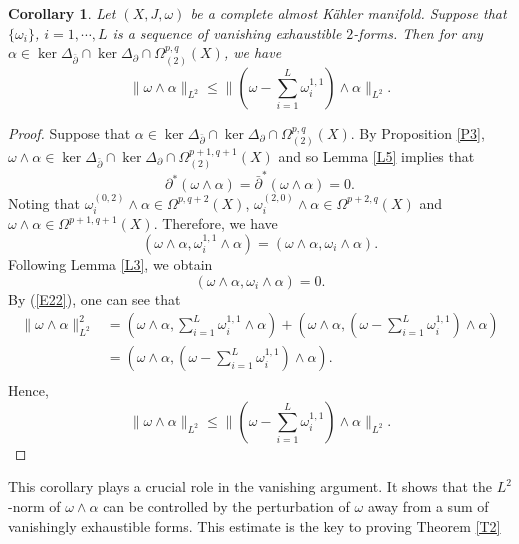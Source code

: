 \documentclass[12pt, twoside]{article}
\newtheorem{corollary}[theorem]{Corollary}
\theoremstyle{definition}
\numberwithin{equation}{section}
\def \a {\alpha }
\def \De {\Delta}
\def\w {\omega}
\def\Om{\Omega}
\def\pa{\partial}
\begin{document}
	\begin{corollary}\label{C1}
		Let  $(X,J,\w)$ be a complete almost K\"{a}hler manifold. Suppose that $\{\w_{i}\}$, $i=1,\cdots,L$ is a sequence of vanishing exhaustible $2$-forms. Then for any $\a\in\ker{\De_{\bar{\pa}}}\cap\ker{\De_{\pa}}\cap\Om^{p,q}_{(2)}(X)$,  we have
		\begin{equation*}
		\|\w\wedge\a\|_{L^2}\leq \|(\w-\sum_{i=1}^{L}\w^{1,1}_{i})\wedge \a\|_{L^2}.
		\end{equation*}
	\end{corollary}
	
	\begin{proof}
		Suppose that $\a\in\ker{\De_{\bar{\pa}}}\cap\ker{\De_{\pa}}\cap\Om^{p,q}_{(2)}(X)$. By Proposition \ref{P3},
		 $\w\wedge\a\in\ker{\De_{\bar{\pa}}}\cap\ker{\De_{\pa}}\cap\Om^{p+1,q+1}_{(2)}(X)$ and so Lemma \ref{L5} implies that $$\pa^{\ast}(\w\wedge\a)=\bar{\pa}^{\ast}(\w\wedge\a)=0.$$ 
		Noting that $\w_{i}^{(0,2)}\wedge\a\in\Om^{p,q+2}(X)$, $\w_{i}^{(2,0)}\wedge\a\in\Om^{p+2,q}(X)$ and $\w\wedge\a\in\Om^{p+1,q+1}(X)$. Therefore, we have
		\begin{equation*}
		(\w\wedge\a,\w_{i}^{1,1}\wedge\a)=(\w\wedge\a,\w_{i}\wedge\a).
		\end{equation*}
		Following Lemma \ref{L3}, we obtain
		\begin{equation}\label{E22}
		(\w\wedge\a,\w_{i}\wedge \a)=0.
		\end{equation}	
		By (\ref{E22}), one can see that
		\begin{equation*}
		\begin{split}
		\|\w\wedge\a\|_{L^2}^{2}&=(\w\wedge\a, \sum_{i=1}^{L}\w^{1,1}_{i}\wedge\a)+(\w\wedge\a,(\w-\sum_{i=1}^{L}\w^{1,1}_{i})\wedge \a)\\
		&=(\w\wedge\a,(\w-\sum_{i=1}^{L}\w^{1,1}_{i})\wedge \a).\\
		\end{split}
		\end{equation*}
		Hence,
		$$\|\w\wedge\a\|_{L^2}\leq \|(\w-\sum_{i=1}^{L}\w^{1,1}_{i})\wedge \a\|_{L^2}.$$
	\end{proof}
	This corollary plays a crucial role in the vanishing argument. It shows that the $L^{2}$-norm of $\w\wedge\a$ can be controlled by the perturbation of $\w$ away from a sum of vanishingly exhaustible forms. This estimate is the key to proving Theorem \ref{T2}
\end{document}
